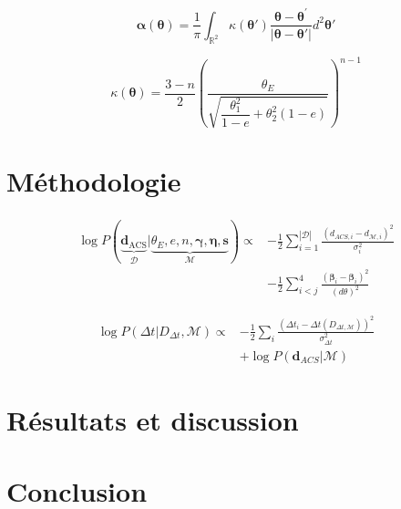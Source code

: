 \documentclass[times,10pt,twocolumn]{article}
\begin{document}
\begin{equation}\label{eq:DeflectinAngle} 
        \boldsymbol{\alpha}(\boldsymbol{\theta}) = \frac{1}{\pi} \int_{\mathbb{R}^{2}} \kappa(\boldsymbol{\theta}')
        \frac{\boldsymbol{\theta} - \boldsymbol{\theta}^{'}}{|\boldsymbol{\theta} - \boldsymbol{\theta}'|}
        d^{2}\boldsymbol{\theta}'
\end{equation} 

\begin{equation}\label{eq:Kappa} 
        \kappa(\boldsymbol{\theta}) = \frac{3 - n}{2} 
        \left( 
        \frac{\theta_E}{\sqrt{\dfrac{\theta_1^2}{1 - e} + \theta_2^2(1 - e)}}
\right)^{n- 1} 
\end{equation} 
\section{Méthodologie}\label{sec:metho}
\begin{align}
        \nonumber
        \log P(\underbrace{\mathbf{d}_{\mathrm{ACS}}}_{\mathcal{D}}
        | \underbrace{\theta_E, e, n, \boldsymbol{\gamma}, \mathbf{\eta}, \mathbf{s}}_{\mathcal{M}}) \propto  
        &-\frac{1}{2}\sum_{i=1}^{|\mathcal{D}|} \frac{(d_{ACS,i} - d_{\mathcal{M}, i})^{2}}{\sigma_i^2}
        \\
\label{eq:Inference} 
        &-\frac{1}{2}\sum_{i < j}^{4} \frac{(\boldsymbol{\beta}_{i} - \boldsymbol{\beta}_i)^{2}}{(d\theta)^{2}}
\end{align} 

\begin{align}
\nonumber
        \log P(\Delta t | D_{\Delta t}, \mathcal{M}) \propto 
        &-\frac{1}{2} \sum_i \frac{(\Delta t_i - \Delta t(D_{\Delta t, \mathcal{M}}))^{2}}{\sigma_{\Delta t}^{2}}
        \\\label{eq:JointLikelihood}
        &+\log P(\mathbf{d}_{ACS} | \mathcal{M})
\end{align}
\section{Résultats et discussion}\label{sec:resultats}
\section{Conclusion}\label{sec:conclusion}

\printbibliography
\end{document}
